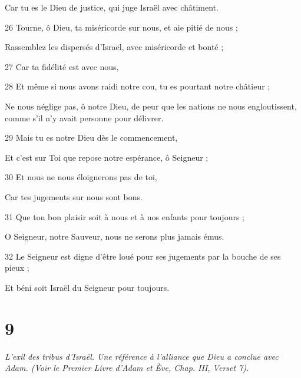 \par     Car tu es le Dieu de justice, qui juge Israël avec châtiment.
\par   
\par 26 Tourne, ô Dieu, ta miséricorde sur nous, et aie pitié de nous ;
\par     Rassemblez les dispersés d'Israël, avec miséricorde et bonté ;
\par 27 Car ta fidélité est avec nous,
\par 28 Et même si nous avons raidi notre cou, tu es pourtant notre châtieur ;
\par     Ne nous néglige pas, ô notre Dieu, de peur que les nations ne nous engloutissent, comme s'il n'y avait personne pour délivrer.
\par   
\par 29 Mais tu es notre Dieu dès le commencement,
\par     Et c’est sur Toi que repose notre espérance, ô Seigneur ;
\par 30 Et nous ne nous éloignerons pas de toi,
\par     Car tes jugements sur nous sont bons.
\par 31 Que ton bon plaisir soit à nous et à nos enfants pour toujours ;
\par     O Seigneur, notre Sauveur, nous ne serons plus jamais émus.
\par 32 Le Seigneur est digne d'être loué pour ses jugements par la bouche de ses pieux ;
\par     Et béni soit Israël du Seigneur pour toujours.

\chapter{9}

\par \textit{L'exil des tribus d'Israël. Une référence à l'alliance que Dieu a conclue avec Adam. (Voir le Premier Livre d'Adam et Ève, Chap. III, Verset 7).}

